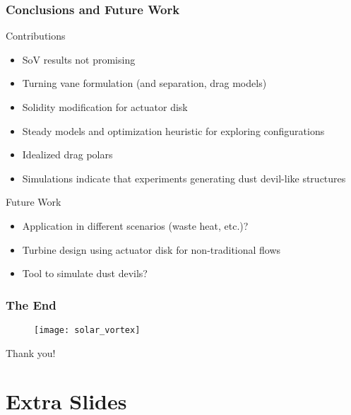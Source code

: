 \documentclass[mathserif]{beamer}
\begin{document}
%
%
\begin{frame}
 \frametitle{Conclusions and Future Work}

 \begin{block}{Contributions}
  \begin{itemize}
  \item SoV results not promising
  \item Turning vane formulation (and separation, drag models)
  \item Solidity modification for actuator disk
  \item Steady models and optimization heuristic for exploring configurations
  \item Idealized drag polars
  \item Simulations indicate that experiments generating dust devil-like structures
  \end{itemize}
 \end{block}


 \begin{block}{Future Work}
  \begin{itemize}
  \item Application in different scenarios (waste heat, etc.)?
  \item Turbine design using actuator disk for non-traditional flows
  \item Tool to simulate dust devils?
  \end{itemize}
 \end{block}
 


\end{frame}

%
%
%
 \begin{frame}
   \frametitle{The End}

   \begin{figure}[htb]
     \centering
     \texttt{[image: solar\_vortex]}
   \end{figure}

   \begin{block}{Thank you!}
    \end{block}
 \end{frame}


%
\appendix
\section{Extra Slides}
\end{document}
